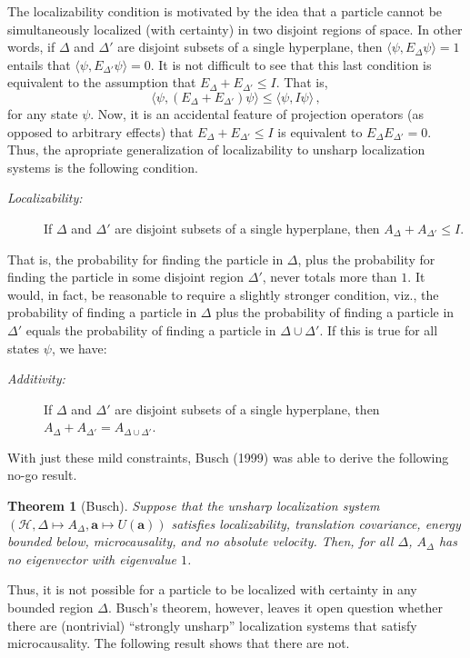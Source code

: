 \documentclass[12pt]{article}
\newtheorem*{thm*}{Theorem}
\theoremstyle{remark}
\newcommand{\hil}[1]{\mathcal{#1}}
\begin{document}
The localizability condition is motivated by the idea that a particle
cannot be simultaneously localized (with certainty) in two disjoint
regions of space.  In other words, if $\Delta$ and $\Delta '$ are
disjoint subsets of a single hyperplane, then $\langle \psi
,E_{\Delta}\psi \rangle =1$ entails that $\langle \psi ,E_{\Delta
  '}\psi \rangle =0$.  It is not difficult to see that this last
condition is equivalent to the assumption that $E_{\Delta}+E_{\Delta
  '}\leq I$.  That is, \begin{equation} \langle \psi
  ,(E_{\Delta}+E_{\Delta '})\psi \rangle \leq \langle \psi ,I\psi
  \rangle \, ,\end{equation} for any state $\psi$.  Now, it is an
accidental feature of projection operators (as opposed to arbitrary
effects) that $E_{\Delta}+E_{\Delta '}\leq I$ is equivalent to
$E_{\Delta}E_{\Delta '}=0$.  Thus, the apropriate generalization of
localizability to unsharp localization systems is the following
condition.
\begin{description}
\item[{\it Localizability:}] If $\Delta$ and $\Delta '$ are disjoint
  subsets of a single hyperplane, then \newline \mbox{$A_{\Delta}+A_{\Delta
      '}\leq I$}.
\end{description}
That is, the probability for finding the particle in $\Delta$, plus
the probability for finding the particle in some disjoint region
$\Delta '$, never totals more than $1$.  It would, in fact, be
reasonable to require a slightly stronger condition, viz., the
probability of finding a particle in $\Delta$ plus the probability of
finding a particle in $\Delta '$ equals the probability of finding a
particle in $\Delta \cup \Delta'$.  If this is true for all states
$\psi$, we have:
\begin{description}
\item[{\it Additivity:}] If $\Delta$ and $\Delta '$ are disjoint
  subsets of a single hyperplane, then \newline
  \mbox{$A_{\Delta}+A_{\Delta '}=A_{\Delta \cup \Delta '}$}.
\end{description}

With just these mild constraints, Busch (1999) was able to derive the
following no-go result.
\begin{thm*}[Busch] Suppose that the unsharp localization system 
  $(\hil{H},\Delta \mapsto A_{\Delta},\mathbf{a}\mapsto
  U(\mathbf{a}))$ satisfies localizability, translation covariance,
  energy bounded below, microcausality, and no absolute velocity.
  Then, for all $\Delta$, $A_{\Delta}$ has no eigenvector with
  eigenvalue $1$.
\end{thm*}
Thus, it is not possible for a particle to be localized with certainty
in any bounded region $\Delta$.  Busch's theorem, however, leaves it
open question whether there are (nontrivial) ``strongly unsharp''
localization systems that satisfy microcausality.  The following
result shows that there are not.
\end{document}
